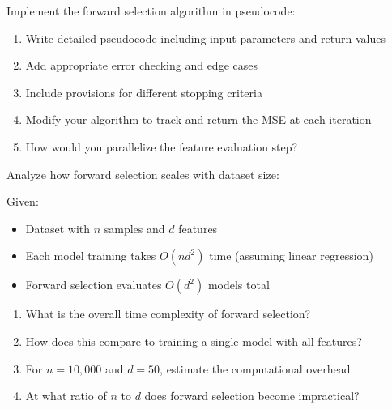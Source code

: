 \documentclass{article}
\newcounter{exercise}
\begin{document}
\begin{tcolorbox}[colback=blue!5!white,colframe=blue!75!black,title=\textbf{Exercise \theexercise: Algorithm Implementation}]
Implement the forward selection algorithm in pseudocode:

\begin{enumerate}[label=(\alph*)]
    \item Write detailed pseudocode including input parameters and return values
    \item Add appropriate error checking and edge cases
    \item Include provisions for different stopping criteria
    \item Modify your algorithm to track and return the MSE at each iteration
    \item How would you parallelize the feature evaluation step?
\end{enumerate}
\end{tcolorbox}

\begin{tcolorbox}[colback=blue!5!white,colframe=blue!75!black,title=\textbf{Exercise \theexercise: Computational Scaling Analysis}]
Analyze how forward selection scales with dataset size:

Given:
\begin{itemize}
    \item Dataset with $n$ samples and $d$ features
    \item Each model training takes $O(nd^2)$ time (assuming linear regression)
    \item Forward selection evaluates $O(d^2)$ models total
\end{itemize}

\begin{enumerate}[label=(\alph*)]
    \item What is the overall time complexity of forward selection?
    \item How does this compare to training a single model with all features?
    \item For $n = 10,000$ and $d = 50$, estimate the computational overhead
    \item At what ratio of $n$ to $d$ does forward selection become impractical?
\end{enumerate}
\end{tcolorbox}
\end{document}
